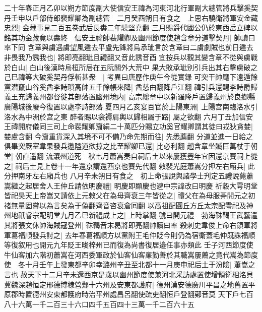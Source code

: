 二十年春正月乙卯以朔方節度副大使信安王禕為河東河北行軍副大總管將兵擊奚契丹壬申以戶部侍郎裴耀卿為副總管　二月癸酉朔日有食之　上思右驍衛將軍安金藏忠烈|{
	金藏事見二百五卷武后長夀二年驍堅堯翻}
三月賜爵代國公仍於東西岳立碑以銘其功金藏竟以夀終　信安王禕帥裴耀卿及幽州節度使趙含章分道擊契丹|{
	帥讀曰率下同}
含章與虜遇虜望風遁去平盧先鋒將烏承玼言於含章曰二虜劇賊也前日遁去非畏我乃誘我也|{
	將即亮翻玼且禮翻又音此誘音酉}
宜按兵以觀其變含章不從與虜戰於白山|{
	白山後漢時烏桓所居在五阮關外大荒中}
果大敗承玼别引兵出其右擊虜破之己巳禕等大破奚契丹俘斬甚衆　|{
	考異曰唐歷作庚午今從實録}
可突干帥麾下遠遁餘黨潜竄山谷奚酋李詩瑣高帥五千餘帳來降|{
	酋慈由翻降戶江翻}
禕引兵還賜李詩爵歸義王充歸義州都督徙其部落置幽州境内|{
	高宗總章中以新羅降戶置歸義州於良鄉縣廣陽城後廢今復置以處李詩部落}
夏四月乙亥宴百官於上陽東洲|{
	上陽宫南臨洛水引洛水為中洲於宫之東}
醉者賜以衾褥肩輿以歸相屬于路|{
	屬之欲翻}
六月丁丑加信安王禕開府儀同三司上命裴耀卿齎絹二十萬匹分賜立功奚官耀卿謂其徒曰戎狄貪婪|{
	婪盧含翻}
今齎重貨深入其境不可不備乃命先期而往|{
	先悉薦翻}
分道並進一日給之俱畢突厥室韋果發兵邀隘道欲掠之比至耀卿已還|{
	比必利翻}
趙含章坐贓巨萬杖于朝堂|{
	朝直遥翻}
流瀼州道死　秋七月蕭嵩奏自祠后土以來屢獲豐年宜因還京賽祠上從之|{
	祠后土見上卷十一年還京謂還西京也賽先代翻}
敕裴光庭蕭嵩分押左右廂兵|{
	此分押南牙左右廂兵也}
八月辛未朔日有食之　初上命張說與諸學士刋定五禮說薨蕭嵩繼之起居舍人王仲丘請依明慶禮|{
	明慶即顯慶也避中宗諱改曰明慶}
祈穀大雩明堂皆祀昊天上帝嵩又請依上元敕父在為母齊衰三年皆從之|{
	禮父在為母服朞開元之初禇無量固嘗以為言矣為于偽翻齊音咨衰倉囘翻}
以高祖配圓丘方丘太宗配雩祀及神州地祇睿宗配明堂九月乙巳新禮成上之|{
	上時掌翻}
號曰開元禮　勃海靺鞨王武藝遣其將張文休帥海賊寇登州|{
	靺鞨音末曷將即亮翻帥讀曰率}
殺刺史韋俊上命右領軍將軍葛福順發兵討之|{
	去年春葛福順方以黨附王毛仲貶今則仍為宿衛蓋毛仲既誅福順等復叙用也開元九年貶王晙梓州已而復為尚書復居邉任事亦類此}
壬子河西節度使牛仙客加六階初蕭嵩在河西委軍政於仙客仙客亷勤善於其職嵩屢薦之竟代嵩為節度使　冬十月壬午上發東都辛卯幸潞州辛丑至北都十一月庚申祀后土于汾隂|{
	蕭嵩之言也}
赦天下十二月辛未還西京是歲以幽州節度使兼河北采訪處置使增領衛相洺貝冀魏深趙恒定邢德博棣營鄚十六州及安東都護府|{
	德州漢安德廣川平昌之地舊置平原郡時置德州安東都護府時治平州處昌呂翻使疏吏翻恒戶登翻鄚音莫}
天下戶七百八十六萬一千二百三十六口四千五百四十三萬一千二百六十五


